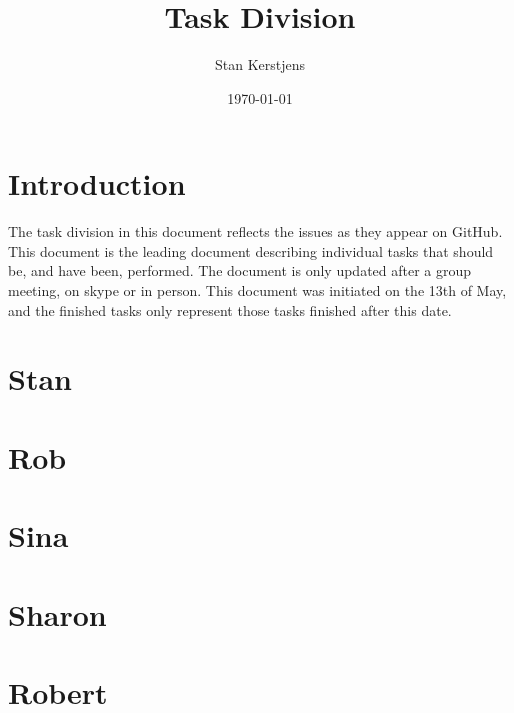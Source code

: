 \documentclass[a4paper]{article}
\title{Task Division}
\author{Stan Kerstjens}
\date{\today}
\begin{document}
	\maketitle

	\section{Introduction}
		The task division in this document reflects the issues as they appear on GitHub. This document is the leading document describing individual tasks that should be, and have been, performed. The document is only updated after a group meeting, on skype or in person. This document was initiated on the 13th of May, and the finished tasks only represent those tasks finished after this date.
	\tableofcontents
	
	\section{Stan}
		
	\section{Rob}
		
	\section{Sina}
		
	\section{Sharon}
		
	\section{Robert}
		
\end{document}
